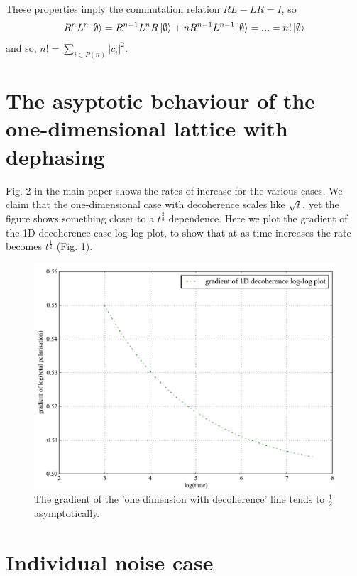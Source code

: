 These properties imply the commutation relation $RL-LR=I$, so\[
R^{n}L^{n}\left\vert\emptyset\right\rangle=R^{n-1}L^{n}R\left\vert\emptyset\right\rangle+nR^{n-1}L^{n-1}\left\vert\emptyset\right\rangle=...=n!\left\vert\emptyset\right\rangle\]
and so, $n!=\sum_{i\in P(n)}|c_{i}|^{2}$.

\section{The asyptotic behaviour of the one-dimensional lattice with dephasing}

Fig. 2 in the main paper shows the rates of increase for the various cases. We claim that the one-dimensional case with decoherence scales like $\sqrt{t}$, yet the figure shows something closer to a $t^\frac{2}{3}$ dependence. Here we plot the gradient of the 1D decoherence case log-log plot, to show that at as time increases the rate becomes $t^\frac{1}{2}$ (Fig. \ref{asymptotic_1d}).

\begin{figure}
  \begin{center}
  \includegraphics[scale=0.4]{assets/asymptotic_1d.pdf}
\end{center}
  \caption{ The gradient of the 'one dimension with decoherence' line tends to $\frac{1}{2}$ asymptotically.}

\label{asymptotic_1d}
\end{figure}

\section{Individual noise case}

